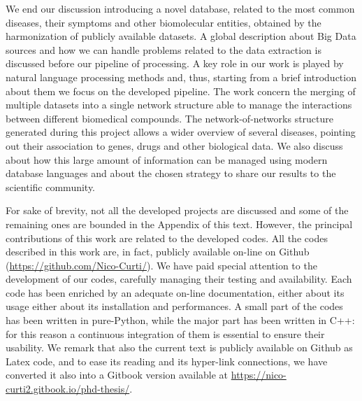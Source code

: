 \documentclass{standalone}
\begin{document}
We end our discussion introducing a novel database, related to the most common diseases, their symptoms and other biomolecular entities, obtained by the harmonization of publicly available datasets.
A global description about Big Data sources and how we can handle problems related to the data extraction is discussed before our pipeline of processing.
A key role in our work is played by natural language processing methods and, thus, starting from a brief introduction about them we focus on the developed pipeline.
The work concern the merging of multiple datasets into a single network structure able to manage the interactions between different biomedical compounds.
The network-of-networks structure generated during this project allows a wider overview of several diseases, pointing out their association to genes, drugs and other biological data.
We also discuss about how this large amount of information can be managed using modern database languages and about the chosen strategy to share our results to the scientific community.

For sake of brevity, not all the developed projects are discussed and some of the remaining ones are bounded in the Appendix of this text.
However, the principal contributions of this work are related to the developed codes.
All the codes described in this work are, in fact, publicly available on-line on Github (\url{https://github.com/Nico-Curti/}).
We have paid special attention to the development of our codes, carefully managing their testing and availability.
Each code has been enriched by an adequate on-line documentation, either about its usage either about its installation and performances.
A small part of the codes has been written in pure-\textsf{Python}, while the major part has been written in \textsf{C++}: for this reason a continuous integration of them is essential to ensure their usability.
We remark that also the current text is publicly available on Github as \textsf{Latex} code, and to ease its reading and its hyper-link connections, we have converted it also into a \textsf{Gitbook} version available at \url{https://nico-curti2.gitbook.io/phd-thesis/}.%



\end{document}
